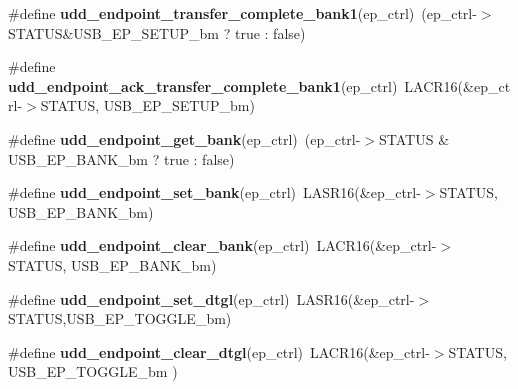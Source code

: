 \begin{DoxyCompactItemize}
\item 
\hypertarget{group__udd__xmega__usb__group_ga6df21d195cf4fdb960a6aadccaa6dff9}{\#define {\bfseries udd\-\_\-endpoint\-\_\-transfer\-\_\-complete\-\_\-bank1}(ep\-\_\-ctrl)~(ep\-\_\-ctrl-\/$>$S\-T\-A\-T\-U\-S\&U\-S\-B\-\_\-\-E\-P\-\_\-\-S\-E\-T\-U\-P\-\_\-bm ? true \-: false)}\label{group__udd__xmega__usb__group_ga6df21d195cf4fdb960a6aadccaa6dff9}

\item 
\hypertarget{group__udd__xmega__usb__group_ga32f367ad572c9de7294bd600305a978a}{\#define {\bfseries udd\-\_\-endpoint\-\_\-ack\-\_\-transfer\-\_\-complete\-\_\-bank1}(ep\-\_\-ctrl)~L\-A\-C\-R16(\&ep\-\_\-ctrl-\/$>$S\-T\-A\-T\-U\-S, U\-S\-B\-\_\-\-E\-P\-\_\-\-S\-E\-T\-U\-P\-\_\-bm)}\label{group__udd__xmega__usb__group_ga32f367ad572c9de7294bd600305a978a}

\item 
\hypertarget{group__udd__xmega__usb__group_gabf1b8ac3c086da3f1dbd9ec103c8c4d5}{\#define {\bfseries udd\-\_\-endpoint\-\_\-get\-\_\-bank}(ep\-\_\-ctrl)~(ep\-\_\-ctrl-\/$>$S\-T\-A\-T\-U\-S \& U\-S\-B\-\_\-\-E\-P\-\_\-\-B\-A\-N\-K\-\_\-bm ? true \-: false)}\label{group__udd__xmega__usb__group_gabf1b8ac3c086da3f1dbd9ec103c8c4d5}

\item 
\hypertarget{group__udd__xmega__usb__group_ga3b55a8fbfc664e0b2a86ff75d60a7320}{\#define {\bfseries udd\-\_\-endpoint\-\_\-set\-\_\-bank}(ep\-\_\-ctrl)~L\-A\-S\-R16(\&ep\-\_\-ctrl-\/$>$S\-T\-A\-T\-U\-S, U\-S\-B\-\_\-\-E\-P\-\_\-\-B\-A\-N\-K\-\_\-bm)}\label{group__udd__xmega__usb__group_ga3b55a8fbfc664e0b2a86ff75d60a7320}

\item 
\hypertarget{group__udd__xmega__usb__group_ga9ae12e95b39ff7739c39d9dfb1dedb25}{\#define {\bfseries udd\-\_\-endpoint\-\_\-clear\-\_\-bank}(ep\-\_\-ctrl)~L\-A\-C\-R16(\&ep\-\_\-ctrl-\/$>$S\-T\-A\-T\-U\-S, U\-S\-B\-\_\-\-E\-P\-\_\-\-B\-A\-N\-K\-\_\-bm)}\label{group__udd__xmega__usb__group_ga9ae12e95b39ff7739c39d9dfb1dedb25}

\item 
\hypertarget{group__udd__xmega__usb__group_ga514f5321fc0444f0d006d0c791e773f7}{\#define {\bfseries udd\-\_\-endpoint\-\_\-set\-\_\-dtgl}(ep\-\_\-ctrl)~L\-A\-S\-R16(\&ep\-\_\-ctrl-\/$>$S\-T\-A\-T\-U\-S,U\-S\-B\-\_\-\-E\-P\-\_\-\-T\-O\-G\-G\-L\-E\-\_\-bm)}\label{group__udd__xmega__usb__group_ga514f5321fc0444f0d006d0c791e773f7}

\item 
\hypertarget{group__udd__xmega__usb__group_ga5e4f834d20fc824afb6441d8562e6bff}{\#define {\bfseries udd\-\_\-endpoint\-\_\-clear\-\_\-dtgl}(ep\-\_\-ctrl)~L\-A\-C\-R16(\&ep\-\_\-ctrl-\/$>$S\-T\-A\-T\-U\-S, U\-S\-B\-\_\-\-E\-P\-\_\-\-T\-O\-G\-G\-L\-E\-\_\-bm )}\label{group__udd__xmega__usb__group_ga5e4f834d20fc824afb6441d8562e6bff}


\end{DoxyCompactItemize}
